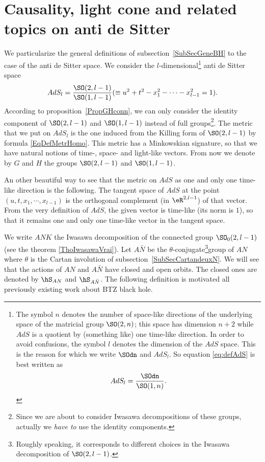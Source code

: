 \section{Causality, light cone and related topics on anti de Sitter} \label{SecCausal}

We particularize the general definitions of subsection~\ref{SubSecGeneBH} to the case of the anti de Sitter space. We consider the $l$-dimensional\footnote{The symbol $n$ denotes the number of space-like directions of the underlying space of the matricial group $\SO(2,n)$; this space has dimension $n+2$ while $AdS$ is a quotient by (something like) one time-like direction. In order to avoid confusions, the symbol $l$ denotes the dimension of the $AdS$ space. This is the reason for which we write $\SOdn$ and $AdS_l$. %
	So equation \eqref{eq:defAdS} is best written as \[AdS_l=\frac{\SOdn}{\SO(1,n)}.\]} anti de Sitter space
\begin{equation}    \label{eq:defAdS}
	AdS_l=\frac{ \SO(2,l-1) }{ \SO(1,l-1) }(\equiv u^2+t^2-x_1^2-\cdots-x_{l-1}^2=1).
\end{equation}
According to proposition~\ref{PropGHconn}, we can only consider the identity component of $\SO(2,l-1)$ and $\SO(1,l-1)$ instead of full groups\footnote{Since we are about to consider Iwasawa decompositions of these groups, actually we \emph{have to} use the identity components.}. The metric that we put on $AdS_l$ is the one induced from the Killing form of $\SO(2,l-1)$ by formula \eqref{EqDefMetrHomo}. This metric has a Minkowskian signature, so that we have  natural notions of time-, space- and light-like vectors. From now we denote by $G$ and $H$ the groups $\SO(2,l-1)$ and $\SO(1,l-1)$.

An other beautiful way to see that the metric on $AdS$ as one and only one time-like direction is the following. The tangent space of $AdS$ at the point $(u,t,x_1,\cdots,x_{l-1})$ is the orthogonal complement (in $\eR^{2,l-1}$) of that vector. From the very definition of $AdS$, the given vector is time-like (its norm is $1$), so that it remains one and only one time-like vector in the tangent space.

We write \( ANK\) the Iwasawa decomposition of the connected group $\SO_0(2,l-1)$ (see the theorem \ref{ThoIwasawaVrai}). Let $A\bar N$ be the $\theta$-conjugate\footnote{Roughly speaking, it corresponds to different choices in the Iwasawa decomposition of $\SO(2,l-1)$.}group of $AN$ where $\theta$ is the Cartan involution of subsection~\ref{SubSecCartandeuxN}. We will see that the actions of $AN$ and $A\bar N$ have closed and open orbits. The closed ones are denoted by $\hS_{AN}$ and $\hS_{A\bar N}$. The following definition is motivated all previously existing work about BTZ black hole.

